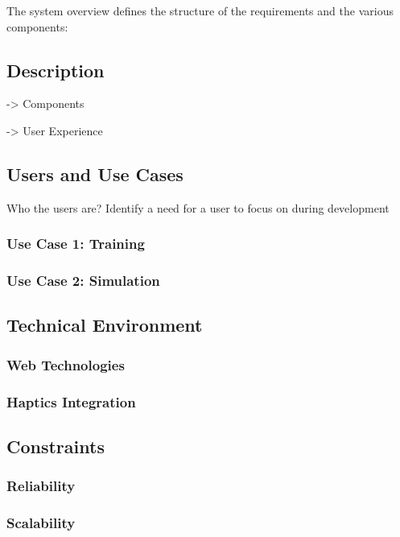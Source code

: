 \documentclass[11pt]{book}
\begin{document}
The system overview defines the structure of the requirements and the various components:

 

\subsection{Description}

-> Components 

-> User Experience 


\subsection{Users and Use Cases} 

Who the users are? Identify a need for a user to focus on during development 


\subsubsection{Use Case 1: Training}

\subsubsection{Use Case 2: Simulation} 
 
 
\subsection{Technical Environment}

\subsubsection{Web Technologies}

\subsubsection{Haptics Integration} 
 
\subsection{Constraints}

\subsubsection{Reliability}

\subsubsection{Scalability}
\end{document}
